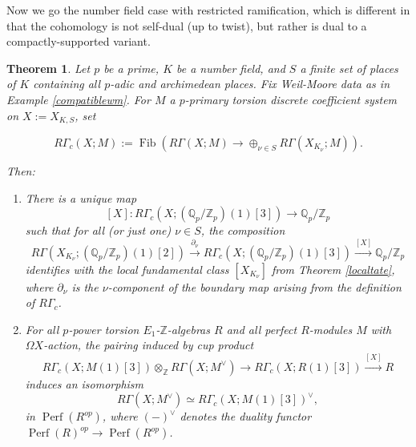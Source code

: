 \documentclass[12pt]{article}
\newtheorem{theorem}{Theorem}[section]
\theoremstyle{definition}
\newcommand{\on}{\operatorname}
\newcommand{\mbb}{\mathbb}
\begin{document}
Now we go the number field case with restricted ramification, which is different in that the cohomology is not self-dual (up to twist), but rather is dual to a compactly-supported variant.
 
\begin{theorem}\label{globaltate}
Let $p$ be a prime, $K$ be a number field, and $S$ a finite set of places of $K$ containing all $p$-adic and archimedean places.  Fix Weil-Moore data as in Example \ref{compatiblewm}.  For $M$ a $p$-primary torsion discrete coefficient system on $X:=X_{K,S}$, set

$$R\Gamma_c(X;M):=\on{Fib}\left(R\Gamma(X;M)\to\oplus_{\nu\in S}R\Gamma(X_{K_\nu};M)\right).$$


Then:
\begin{enumerate}
\item There is a unique map
$$[X]:R\Gamma_c(X;(\mbb{Q}_p/\mbb{Z}_p)(1)[3]) \to \mbb{Q}_p/\mbb{Z}_p$$
such that for all (or just one) $\nu\in S$, the composition
$$R\Gamma(X_{K_\nu};(\mbb{Q}_p/\mbb{Z}_p)(1)[2])\overset{\partial_\nu} {\longrightarrow} R\Gamma_c(X;(\mbb{Q}_p/\mbb{Z}_p)(1)[3])\overset{[X]}{\longrightarrow} \mbb{Q}_p/\mbb{Z}_p$$
identifies with the local fundamental class $[X_{K_\nu}]$ from Theorem \ref{localtate}, where $\partial_\nu$ is the $\nu$-component of the boundary map arising from the definition of $R\Gamma_c$.
\item For all $p$-power torsion $E_1$-$\mbb{Z}$-algebras $R$ and all perfect $R$-modules $M$ with $\Omega X$-action, the pairing induced by cup product
$$ R\Gamma_c(X;M(1)[3]) \otimes_{\mbb{Z}} R\Gamma(X;M^\vee) \to R\Gamma_c(X;R(1)[3])\overset{[X]}{\longrightarrow} R$$
induces an isomorphism $$R\Gamma(X;M^\vee)\simeq R\Gamma_c(X;M(1)[3])^\vee,$$
in $\on{Perf}(R^{op})$, where $(-)^\vee$ denotes the duality functor $\on{Perf}(R)^{op} \to \on{Perf}(R^{op})$.
\end{enumerate}
\end{theorem}
\end{document}
